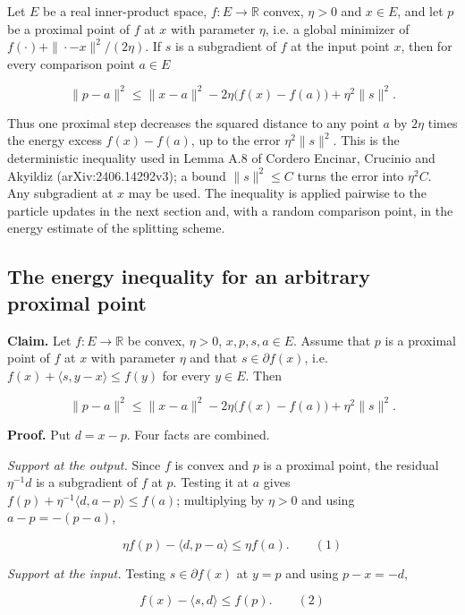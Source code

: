 \documentclass[11pt,a4paper]{report}
\begin{document}
Let \(E\) be a real inner-product space, \(f:E\to\mathbb R\) convex, \(\eta>0\) and \(x\in E\), and let \(p\) be a proximal point of \(f\) at \(x\) with parameter \(\eta\), i.e. a global minimizer of \(f(\cdot)+\|\cdot-x\|^2/(2\eta)\). If \(s\) is a subgradient of \(f\) at the input point \(x\), then for every comparison point \(a\in E\)


\[\|p-a\|^2\le\|x-a\|^2-2\eta\bigl(f(x)-f(a)\bigr)+\eta^2\|s\|^2.\]


Thus one proximal step decreases the squared distance to any point \(a\) by \(2\eta\) times the energy excess \(f(x)-f(a)\), up to the error \(\eta^2\|s\|^2\). This is the deterministic inequality used in Lemma A.8 of Cordero Encinar, Crucinio and Akyildiz (arXiv:2406.14292v3); a bound \(\|s\|^2\le C\) turns the error into \(\eta^2C\). Any subgradient at \(x\) may be used. The inequality is applied pairwise to the particle updates in the next section and, with a random comparison point, in the energy estimate of the splitting scheme.

\subsection{\texorpdfstring{The energy inequality for an arbitrary proximal point}{The energy inequality for an arbitrary proximal point}}
\label{report-step-ProximalLangevin-ProximalEnergy-lean-1}


\textbf{Claim.} Let \(f:E\to\mathbb R\) be convex, \(\eta>0\), \(x,p,s,a\in E\). Assume that \(p\) is a proximal point of \(f\) at \(x\) with parameter \(\eta\) and that \(s\in\partial f(x)\), i.e. \(f(x)+\langle s,y-x\rangle\le f(y)\) for every \(y\in E\). Then


\[\|p-a\|^2\le\|x-a\|^2-2\eta\bigl(f(x)-f(a)\bigr)+\eta^2\|s\|^2.\]


\textbf{Proof.} Put \(d=x-p\). Four facts are combined.




\emph{Support at the output.} Since \(f\) is convex and \(p\) is a proximal point, the residual \(\eta^{-1}d\) is a subgradient of \(f\) at \(p\). Testing it at \(a\) gives \(f(p)+\eta^{-1}\langle d,a-p\rangle\le f(a)\); multiplying by \(\eta>0\) and using \(a-p=-(p-a)\),


\[\eta f(p)-\langle d,p-a\rangle\le\eta f(a).\qquad(1)\]


\emph{Support at the input.} Testing \(s\in\partial f(x)\) at \(y=p\) and using \(p-x=-d\),


\[f(x)-\langle s,d\rangle\le f(p).\qquad(2)\]
\end{document}
